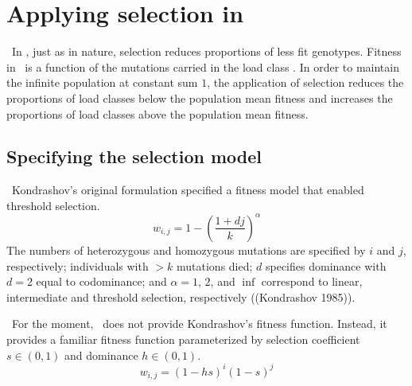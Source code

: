 % 

\chapter{Applying selection in \K}

\REDO\  In \K, just as in nature, selection reduces proportions of less fit genotypes.  Fitness in \K\ is a function of the mutations carried in the load class \Lij.  In order to maintain the infinite population at constant sum $1$, the application of selection reduces the proportions of load classes below the population mean fitness and increases the proportions of load classes above the population mean fitness.

\section{Specifying the selection model}

\REDO\  Kondrashov's original formulation specified a fitness model that enabled threshold selection.
\begin{equation}
w_{i,j}=1-({\frac{1+dj}{k}})^\alpha
\end{equation}
The numbers of heterozygous and homozygous mutations are specified by $i$ and $j$, respectively; individuals with $>k$ mutations died; $d$ specifies dominance with $d=2$ equal to codominance; and $\alpha=1$, $2$, and $\inf$ correspond to linear, intermediate and threshold selection, respectively ((Kondrashov 1985)).

\REDO\  For the moment, \K\ does not provide Kondrashov's fitness function.  Instead, it provides a familiar fitness function parameterized by selection coefficient $s\in(0,1)$ and dominance $h\in(0,1)$.
\begin{equation}
w_{i,j}=(1-hs)^{i}(1-s)^{j}
\end{equation}

